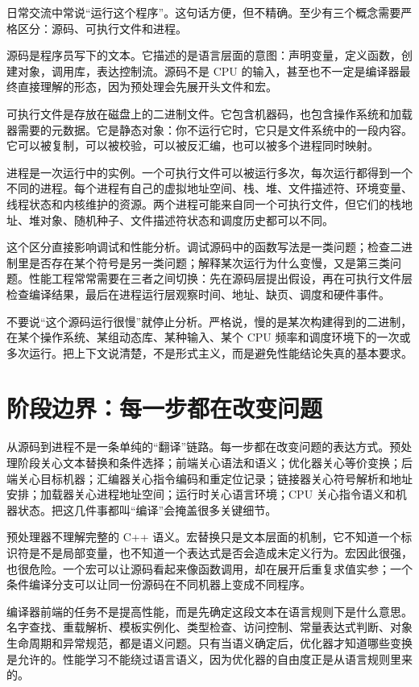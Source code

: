 日常交流中常说“运行这个程序”。这句话方便，但不精确。至少有三个概念需要严格区分：源码、可执行文件和进程。

源码是程序员写下的文本。它描述的是语言层面的意图：声明变量，定义函数，创建对象，调用库，表达控制流。源码不是 CPU 的输入，甚至也不一定是编译器最终直接理解的形态，因为预处理会先展开头文件和宏。

可执行文件是存放在磁盘上的二进制文件。它包含机器码，也包含操作系统和加载器需要的元数据。它是静态对象：你不运行它时，它只是文件系统中的一段内容。它可以被复制，可以被校验，可以被反汇编，也可以被多个进程同时映射。

进程是一次运行中的实例。一个可执行文件可以被运行多次，每次运行都得到一个不同的进程。每个进程有自己的虚拟地址空间、栈、堆、文件描述符、环境变量、线程状态和内核维护的资源。两个进程可能来自同一个可执行文件，但它们的栈地址、堆对象、随机种子、文件描述符状态和调度历史都可以不同。

这个区分直接影响调试和性能分析。调试源码中的函数写法是一类问题；检查二进制里是否存在某个符号是另一类问题；解释某次运行为什么变慢，又是第三类问题。性能工程常常需要在三者之间切换：先在源码层提出假设，再在可执行文件层检查编译结果，最后在进程运行层观察时间、地址、缺页、调度和硬件事件。

\begin{warningbox}
不要说“这个源码运行很慢”就停止分析。严格说，慢的是某次构建得到的二进制，在某个操作系统、某组动态库、某种输入、某个 CPU 频率和调度环境下的一次或多次运行。把上下文说清楚，不是形式主义，而是避免性能结论失真的基本要求。
\end{warningbox}

\section{阶段边界：每一步都在改变问题}

从源码到进程不是一条单纯的“翻译”链路。每一步都在改变问题的表达方式。预处理阶段关心文本替换和条件选择；前端关心语法和语义；优化器关心等价变换；后端关心目标机器；汇编器关心指令编码和重定位记录；链接器关心符号解析和地址安排；加载器关心进程地址空间；运行时关心语言环境；CPU 关心指令语义和机器状态。把这几件事都叫“编译”会掩盖很多关键细节。

预处理器不理解完整的 C++ 语义。宏替换只是文本层面的机制，它不知道一个标识符是不是局部变量，也不知道一个表达式是否会造成未定义行为。宏因此很强，也很危险。一个宏可以让源码看起来像函数调用，却在展开后重复求值实参；一个条件编译分支可以让同一份源码在不同机器上变成不同程序。

编译器前端的任务不是提高性能，而是先确定这段文本在语言规则下是什么意思。名字查找、重载解析、模板实例化、类型检查、访问控制、常量表达式判断、对象生命周期和异常规范，都是语义问题。只有当语义确定后，优化器才知道哪些变换是允许的。性能学习不能绕过语言语义，因为优化器的自由度正是从语言规则里来的。

